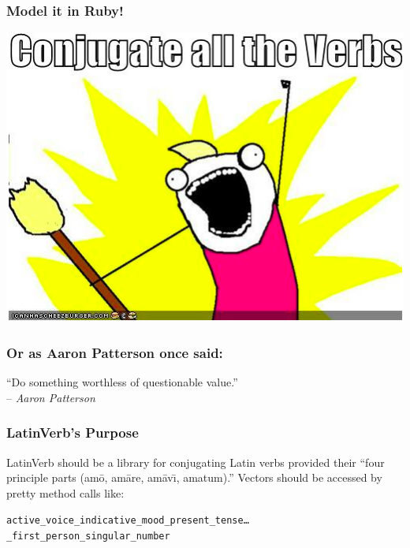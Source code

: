 \documentclass[slidestop,compress,mathserif]{beamer}
\begin{document}
\begin{frame}
	\frametitle{Model it in Ruby!}
	\begin{center}
		\includegraphics[scale=0.45]{img/brosh_all.png}
	\end{center}	
\end{frame}

\begin{frame}
	\frametitle{Or as Aaron Patterson once said:}
	\begin{center}
		``Do something worthless of questionable value.'' \\ -- \emph{Aaron Patterson}
	\end{center}	
\end{frame}


\begin{frame}
	\frametitle{LatinVerb's Purpose}
	LatinVerb should be a library for conjugating Latin verbs provided their ``four principle parts (am\={o}, am\={a}re, am\={a}v\={\i}, amatum).''
	\pause
	\vskip 0.5cm
	Vectors should be accessed by pretty method calls like: 
	\vskip 0.5cm 

	\texttt{active\_voice\_indicative\_mood\_present\_tense{\ldots}\\
	\_first\_person\_singular\_number}

\end{frame}
\end{document}
